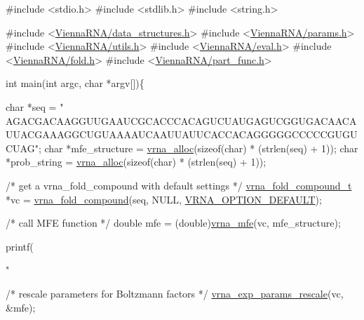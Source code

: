 \begin{DoxyCodeInclude}
\textcolor{preprocessor}{#include <stdio.h>}
\textcolor{preprocessor}{#include <stdlib.h>}
\textcolor{preprocessor}{#include <string.h>}

\textcolor{preprocessor}{#include  <\mbox{\hyperlink{data__structures_8h}{ViennaRNA/data\_structures.h}}>}
\textcolor{preprocessor}{#include  <\mbox{\hyperlink{params_8h}{ViennaRNA/params.h}}>}
\textcolor{preprocessor}{#include  <\mbox{\hyperlink{utils_8h}{ViennaRNA/utils.h}}>}
\textcolor{preprocessor}{#include  <\mbox{\hyperlink{eval_8h}{ViennaRNA/eval.h}}>}
\textcolor{preprocessor}{#include  <\mbox{\hyperlink{fold_8h}{ViennaRNA/fold.h}}>}
\textcolor{preprocessor}{#include  <\mbox{\hyperlink{part__func_8h}{ViennaRNA/part\_func.h}}>}


\textcolor{keywordtype}{int} main(\textcolor{keywordtype}{int} argc, \textcolor{keywordtype}{char} *argv[])\{

  \textcolor{keywordtype}{char}  *seq = \textcolor{stringliteral}{"
      AGACGACAAGGUUGAAUCGCACCCACAGUCUAUGAGUCGGUGACAACAUUACGAAAGGCUGUAAAAUCAAUUAUUCACCACAGGGGGCCCCCGUGUCUAG"};
  \textcolor{keywordtype}{char}  *mfe\_structure = \mbox{\hyperlink{group__utils_gaf37a0979367c977edfb9da6614eebe99}{vrna\_alloc}}(\textcolor{keyword}{sizeof}(\textcolor{keywordtype}{char}) * (strlen(seq) + 1));
  \textcolor{keywordtype}{char}  *prob\_string   = \mbox{\hyperlink{group__utils_gaf37a0979367c977edfb9da6614eebe99}{vrna\_alloc}}(\textcolor{keyword}{sizeof}(\textcolor{keywordtype}{char}) * (strlen(seq) + 1));

  \textcolor{comment}{/* get a vrna\_fold\_compound with default settings */}
  \mbox{\hyperlink{group__fold__compound_structvrna__fc__s}{vrna\_fold\_compound\_t}} *vc = \mbox{\hyperlink{group__fold__compound_ga6601d994ba32b11511b36f68b08403be}{vrna\_fold\_compound}}(seq, NULL, 
      \mbox{\hyperlink{group__fold__compound_gacea5b7ee6181c485f36e2afa0e9089e4}{VRNA\_OPTION\_DEFAULT}});

  \textcolor{comment}{/* call MFE function */}
  \textcolor{keywordtype}{double} mfe = (double)\mbox{\hyperlink{group__mfe__fold_gabd3b147371ccf25c577f88bbbaf159fd}{vrna\_mfe}}(vc, mfe\_structure);

  printf(\textcolor{stringliteral}{"%

  \textcolor{comment}{/* rescale parameters for Boltzmann factors */}
  \mbox{\hyperlink{group__energy__parameters_gad607bc3a5b5da16400e2ca4ea5560233}{vrna\_exp\_params\_rescale}}(vc, &mfe);

}
\end{DoxyCodeInclude}
